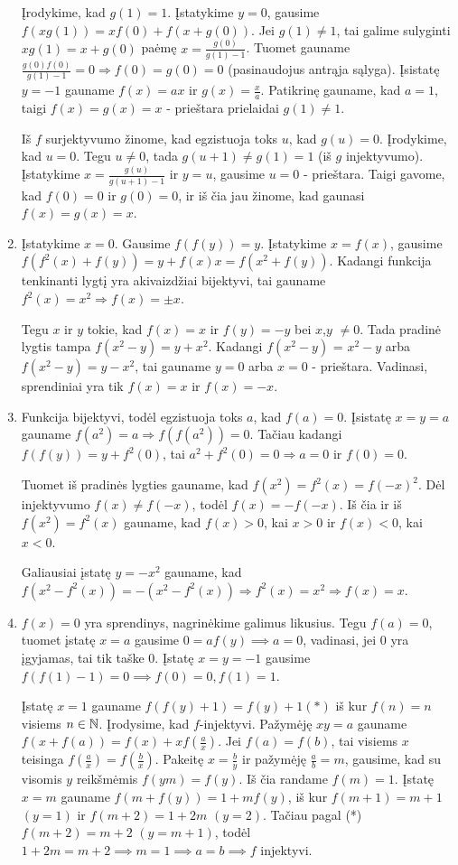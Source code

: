 \begin{enumerate}
    Įrodykime, kad $g(1)=1$. Įstatykime $y = 0$, gausime $f(xg(1)) = xf(0)
    + f(x + g(0))$. Jei $g(1)\neq 1$, tai galime sulyginti $xg(1)=x+g(0)$
    paėmę $x = \frac{g(0)}{g(1)-1}$. Tuomet gauname
    $\frac{g(0)f(0)}{g(1)-1}=0 \Rightarrow f(0)=g(0)=0$ (pasinaudojus
    antrąja sąlyga). Įsistatę $y = -1$ gauname $f(x)=ax$ ir
    $g(x)=\frac{x}{a}$. Patikrinę gauname, kad $a =1$, taigi $f(x)=g(x)=x$
    - prieštara prielaidai $g(1)\neq 1$.
    
    Iš $f$ surjektyvumo žinome, kad egzistuoja toks $u$, kad $g(u)=0$.
    Įrodykime, kad $u = 0$.  Tegu $u \neq 0$, tada $g(u+1)\neq g(1)=1$ (iš
    $g$ injektyvumo).  Įstatykime $x = \frac{g(u)}{g(u+1)-1}$ ir $y = u$,
    gausime $u = 0$ - prieštara.
    Taigi gavome, kad $f(0)=0$ ir $g(0)=0$, ir iš čia jau žinome, kad
    gaunasi $f(x)=g(x)=x$.
\item
    Įstatykime $x = 0$. Gausime $f(f(y))=y$. Įstatykime $x=f(x)$, gausime
    $f(f^2(x) + f(y)) = y + f(x)x = f(x^2 + f(y))$. Kadangi funkcija
    tenkinanti lygtį yra akivaizdžiai bijektyvi, tai gauname
    $f^2(x)=x^2 \Rightarrow f(x)=\pm x$.
    
    Tegu $x$ ir $y$ tokie, kad $f(x)=x$ ir $f(y)=-y$ bei $x$,$y$ $\neq 0$.
    Tada pradinė lygtis tampa $f(x^2 - y)=y+x^2$. Kadangi $f(x^2-y)$ =
    $x^2 - y$ arba $f(x^2-y) = y -x^2$, tai gauname $y=0$ arba $x = 0$ -
    prieštara. Vadinasi, sprendiniai yra tik $f(x)=x$ ir $f(x)=-x$.
\item
    Funkcija bijektyvi, todėl egzistuoja toks $a$, kad $f(a)=0$. Įsistatę
    $x=y=a$ gauname $f(a^2)=a \Rightarrow f(f(a^2))=0$. Tačiau kadangi
    $f(f(y))=y + f^2(0)$, tai $a^2+f^2(0)=0 \Rightarrow a=0$ ir $f(0)=0$.
    
    Tuomet iš pradinės lygties gauname, kad $f(x^2)=f^2(x)=f(-x)^2$. Dėl
    injektyvumo $f(x)\neq f(-x)$, todėl $f(x)=-f(-x)$. Iš čia ir iš
    $f(x^2)=f^2(x)$ gauname, kad $f(x)>0$, kai $x>0$ ir $f(x)<0$, kai
    $x<0$.
    
    Galiausiai įstatę $y=-x^2$ gauname, kad $f(x^2-f^2(x))=-(x^2-f^2(x))
    \Rightarrow f^2(x)=x^2 \Rightarrow f(x)=x$.
\item
    $f(x)=0$ yra sprendinys, nagrinėkime galimus likusius. Tegu $f(a)=0$,
    tuomet įstatę $x=a$ gausime $0=af(y) \implies a=0$, vadinasi, jei
    $0$ yra įgyjamas, tai tik taške $0$. Įstatę $x=y=-1$ gausime
    $f(f(1)-1)=0 \implies f(0)=0, f(1)=1$.
    
    Įstatę $x=1$ gauname $f(f(y)+1)=f(y)+1(*)$ iš kur $f(n)=n$ visiems
    $n\in \mathbb N$. Įrodysime, kad $f$-injektyvi. Pažymėję $xy=a$ gauname
    $f(x+f(a))=f(x)+xf(\frac{a}{x})$. Jei $f(a)=f(b)$, tai visiems $x$
    teisinga $f(\frac{a}{x}) = f(\frac{b}{x})$. Pakeitę $x=\frac{b}{y}$ ir pažymėję
    $\frac{a}{b}=m$, gausime, kad su visomis $y$ reikšmėmis $f(ym)=f(y)$. Iš čia
    randame $f(m)=1$. Įstatę $x=m$ gauname $f(m + f(y))=1+mf(y)$, iš kur
    $f(m+1)=m+1$ $(y=1)$ ir $f(m+2)=1+2m$ $(y=2)$. Tačiau pagal (*)
    $f(m+2)=m+2$ $(y=m+1)$, todėl $1+2m = m+2 \implies m=1 \implies
    a=b \implies f$ injektyvi.
    

\end{enumerate}
